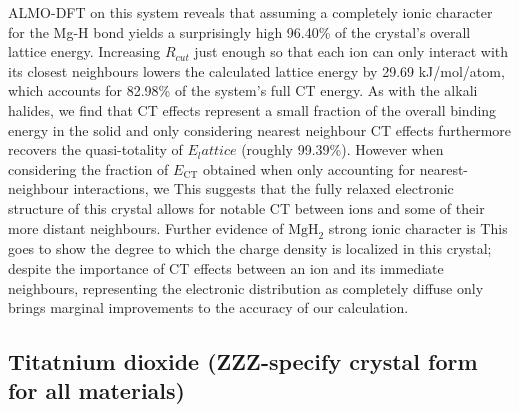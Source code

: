 \documentclass[aps,prb,twocolumn,amsmath,amssymb,superscriptaddress,longbibliography]{revtex4-1}
\begin{document}
ALMO-DFT on this system reveals that assuming a completely ionic character for the Mg-H bond yields a surprisingly high 96.40\% of the crystal's overall lattice energy.  
Increasing $R_{cut}$ just enough so that each ion can only interact with its closest neighbours lowers the calculated lattice energy by 29.69 kJ/mol/atom, which accounts for 82.98\% of the system's full CT energy.
As with the alkali halides, we find that CT effects represent a small fraction of the overall binding energy in the solid and only considering nearest neighbour CT effects furthermore recovers the quasi-totality of $E_lattice$ (roughly 99.39\%).
However when considering the fraction of $E_{\text{CT}}$ obtained when only accounting for nearest-neighbour interactions, we
This suggests that the fully relaxed electronic structure of this crystal allows for notable CT between ions and some of their more distant neighbours.
Further evidence of $\text{MgH}_{2}$ strong ionic character is  
This goes to show the degree to which the charge density is localized in this crystal; despite the importance of CT effects between an ion and its immediate neighbours, representing the electronic distribution as completely diffuse only brings marginal improvements to the accuracy of our calculation. 


\subsection*{Titatnium dioxide (ZZZ-specify crystal form for all materials)}
\end{document}
